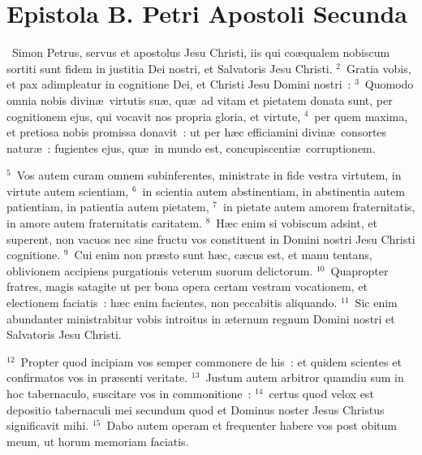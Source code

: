 {\centering \section*{Epistola B. Petri Apostoli Secunda}}\thispagestyle{empty}

~Simon Petrus, servus et apostolus Jesu Christi, iis qui co\ae qualem nobiscum sortiti sunt fidem in justitia Dei nostri, et Salvatoris Jesu Christi.
${}^{2}$~Gratia vobis, et pax adimpleatur in cognitione Dei, et Christi Jesu Domini nostri~:
${}^{3}$~Quomodo omnia nobis divin\ae\ virtutis su\ae , qu\ae\ ad vitam et pietatem donata sunt, per cognitionem ejus, qui vocavit nos propria gloria, et virtute,
${}^{4}$~per quem maxima, et pretiosa nobis promissa donavit~: ut per h\ae c efficiamini divin\ae\ consortes natur\ae~: fugientes ejus, qu\ae\ in mundo est, concupiscenti\ae\ corruptionem.


${}^{5}$~Vos autem curam omnem subinferentes, ministrate in fide vestra virtutem, in virtute autem scientiam,
${}^{6}$~in scientia autem abstinentiam, in abstinentia autem patientiam, in patientia autem pietatem,
${}^{7}$~in pietate autem amorem fraternitatis, in amore autem fraternitatis caritatem.
${}^{8}$~H\ae c enim si vobiscum adsint, et superent, non vacuos nec sine fructu vos constituent in Domini nostri Jesu Christi cognitione.
${}^{9}$~Cui enim non pr\ae sto sunt h\ae c, c\ae cus est, et manu tentans, oblivionem accipiens purgationis veterum suorum delictorum.
${}^{10}$~Quapropter fratres, magis satagite ut per bona opera certam vestram vocationem, et electionem faciatis~: h\ae c enim facientes, non peccabitis aliquando.
${}^{11}$~Sic enim abundanter ministrabitur vobis introitus in \ae ternum regnum Domini nostri et Salvatoris Jesu Christi.


${}^{12}$~Propter quod incipiam vos semper commonere de his~: et quidem scientes et confirmatos vos in pr\ae senti veritate.
${}^{13}$~Justum autem arbitror quamdiu sum in hoc tabernaculo, suscitare vos in commonitione~:
${}^{14}$~certus quod velox est depositio tabernaculi mei secundum quod et Dominus noster Jesus Christus significavit mihi.
${}^{15}$~Dabo autem operam et frequenter habere vos post obitum meum, ut horum memoriam faciatis.


